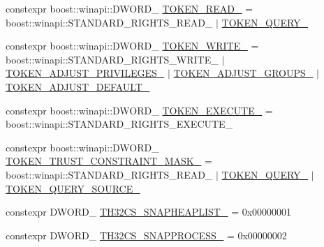 \begin{DoxyCompactItemize}
\item 
constexpr boost\+::winapi\+::\+D\+W\+O\+R\+D\+\_\+ \mbox{\hyperlink{namespaceboost_1_1winapi_a75da7dd90f2e1e86adcf03adc73c1c69}{T\+O\+K\+E\+N\+\_\+\+R\+E\+A\+D\+\_\+}} = boost\+::winapi\+::\+S\+T\+A\+N\+D\+A\+R\+D\+\_\+\+R\+I\+G\+H\+T\+S\+\_\+\+R\+E\+A\+D\+\_\+ $\vert$ \mbox{\hyperlink{namespaceboost_1_1winapi_aa8d690e5577abdf2d156cbcda5cf23fb}{T\+O\+K\+E\+N\+\_\+\+Q\+U\+E\+R\+Y\+\_\+}}
\item 
constexpr boost\+::winapi\+::\+D\+W\+O\+R\+D\+\_\+ \mbox{\hyperlink{namespaceboost_1_1winapi_aa3759e68597b280f97ab3f8c467ece85}{T\+O\+K\+E\+N\+\_\+\+W\+R\+I\+T\+E\+\_\+}} = boost\+::winapi\+::\+S\+T\+A\+N\+D\+A\+R\+D\+\_\+\+R\+I\+G\+H\+T\+S\+\_\+\+W\+R\+I\+T\+E\+\_\+ $\vert$ \mbox{\hyperlink{namespaceboost_1_1winapi_ae421c93ef942bc0c7728ecd495a19208}{T\+O\+K\+E\+N\+\_\+\+A\+D\+J\+U\+S\+T\+\_\+\+P\+R\+I\+V\+I\+L\+E\+G\+E\+S\+\_\+}} $\vert$ \mbox{\hyperlink{namespaceboost_1_1winapi_a5bceb0371395d6c4af2c6fd537a9df1c}{T\+O\+K\+E\+N\+\_\+\+A\+D\+J\+U\+S\+T\+\_\+\+G\+R\+O\+U\+P\+S\+\_\+}} $\vert$ \mbox{\hyperlink{namespaceboost_1_1winapi_a392915600d4ba82203d0ac72f10e8563}{T\+O\+K\+E\+N\+\_\+\+A\+D\+J\+U\+S\+T\+\_\+\+D\+E\+F\+A\+U\+L\+T\+\_\+}}
\item 
constexpr boost\+::winapi\+::\+D\+W\+O\+R\+D\+\_\+ \mbox{\hyperlink{namespaceboost_1_1winapi_ac73d765eab000f25070ed41c9b416dd9}{T\+O\+K\+E\+N\+\_\+\+E\+X\+E\+C\+U\+T\+E\+\_\+}} = boost\+::winapi\+::\+S\+T\+A\+N\+D\+A\+R\+D\+\_\+\+R\+I\+G\+H\+T\+S\+\_\+\+E\+X\+E\+C\+U\+T\+E\+\_\+
\item 
constexpr boost\+::winapi\+::\+D\+W\+O\+R\+D\+\_\+ \mbox{\hyperlink{namespaceboost_1_1winapi_a5e9eb7c82d58f9a4b581d8e946f42b63}{T\+O\+K\+E\+N\+\_\+\+T\+R\+U\+S\+T\+\_\+\+C\+O\+N\+S\+T\+R\+A\+I\+N\+T\+\_\+\+M\+A\+S\+K\+\_\+}} = boost\+::winapi\+::\+S\+T\+A\+N\+D\+A\+R\+D\+\_\+\+R\+I\+G\+H\+T\+S\+\_\+\+R\+E\+A\+D\+\_\+ $\vert$ \mbox{\hyperlink{namespaceboost_1_1winapi_aa8d690e5577abdf2d156cbcda5cf23fb}{T\+O\+K\+E\+N\+\_\+\+Q\+U\+E\+R\+Y\+\_\+}} $\vert$ \mbox{\hyperlink{namespaceboost_1_1winapi_af504352b775da9ed41d3e8d451fb60b2}{T\+O\+K\+E\+N\+\_\+\+Q\+U\+E\+R\+Y\+\_\+\+S\+O\+U\+R\+C\+E\+\_\+}}
\item 
constexpr D\+W\+O\+R\+D\+\_\+ \mbox{\hyperlink{namespaceboost_1_1winapi_af77c6a7f30e9b6ca9df6d4b8b1f449ba}{T\+H32\+C\+S\+\_\+\+S\+N\+A\+P\+H\+E\+A\+P\+L\+I\+S\+T\+\_\+}} = 0x00000001
\item 
constexpr D\+W\+O\+R\+D\+\_\+ \mbox{\hyperlink{namespaceboost_1_1winapi_a09b08eb6e34c75ab2914c7b1284739d4}{T\+H32\+C\+S\+\_\+\+S\+N\+A\+P\+P\+R\+O\+C\+E\+S\+S\+\_\+}} = 0x00000002

\end{DoxyCompactItemize}
